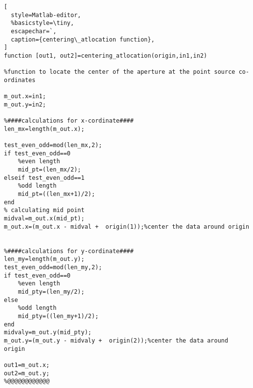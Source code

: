 \begin{lstlisting}[
  style=Matlab-editor,
  %basicstyle=\tiny,
  escapechar=`,
  caption={centering\_atlocation function},
]
function [out1, out2]=centering_atlocation(origin,in1,in2)

%function to locate the center of the aperture at the point source co-ordinates

m_out.x=in1;
m_out.y=in2;

%####calculations for x-cordinate####
len_mx=length(m_out.x);

test_even_odd=mod(len_mx,2);
if test_even_odd==0
    %even length
    mid_pt=(len_mx/2);
elseif test_even_odd==1
    %odd length
    mid_pt=((len_mx+1)/2);
end
% calculating mid point
midval=m_out.x(mid_pt);
m_out.x=(m_out.x - midval +  origin(1));%center the data around origin


%####calculations for y-cordinate####
len_my=length(m_out.y);
test_even_odd=mod(len_my,2);
if test_even_odd==0
    %even length
    mid_pty=(len_my/2);
else
    %odd length
    mid_pty=((len_my+1)/2);
end
midvaly=m_out.y(mid_pty);
m_out.y=(m_out.y - midvaly +  origin(2));%center the data around origin

out1=m_out.x;
out2=m_out.y;
%@@@@@@@@@@@@
   

\end{lstlisting}


